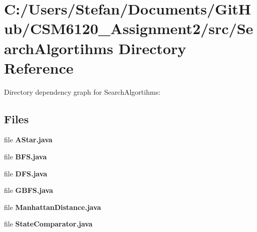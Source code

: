 \section{C\+:/\+Users/\+Stefan/\+Documents/\+Git\+Hub/\+C\+S\+M6120\+\_\+\+Assignment2/src/\+Search\+Algortihms Directory Reference}
\label{dir_6b5681e7e189b03c27f2fe8a42425c22}
Directory dependency graph for Search\+Algortihms\+:
\subsection*{Files}
\begin{DoxyCompactItemize}
\item 
file {\bf A\+Star.\+java}
\item 
file {\bf B\+F\+S.\+java}
\item 
file {\bf D\+F\+S.\+java}
\item 
file {\bf G\+B\+F\+S.\+java}
\item 
file {\bf Manhattan\+Distance.\+java}
\item 
file {\bf State\+Comparator.\+java}
\end{DoxyCompactItemize}
